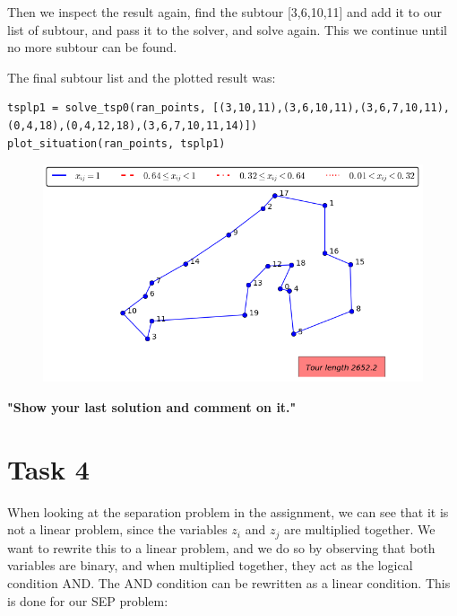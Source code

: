 \documentclass[a4paper,10pt]{article}
\begin{document}
Then we inspect the result again, find the subtour [3,6,10,11] and add it to our list of subtour, and pass it to the solver, and solve again. This we continue until no more subtour can be found.

The final subtour list and the plotted result was:

\begin{lstlisting}
tsplp1 = solve_tsp0(ran_points, [(3,10,11),(3,6,10,11),(3,6,7,10,11),(0,4,18),(0,4,12,18),(3,6,7,10,11,14)])
plot_situation(ran_points, tsplp1)
\end{lstlisting}

\begin{figure}[htb]
\begin{center}
\includegraphics[scale=1.4/textwidth]{task3.3.png}
\end{center}
\end{figure}

\textbf{"Show your last solution and comment on it."}

\newpage
\section*{Task 4}

When looking at the separation problem in the assignment, we can see that it is not a linear problem, since the variables $z_i$ and $z_j$ are multiplied together. We want to rewrite this to a linear problem, and we do so by observing that both variables are binary, and when multiplied together, they act as the logical condition AND. The AND condition can be rewritten as a linear condition. This is done for our SEP problem:
\end{document}
